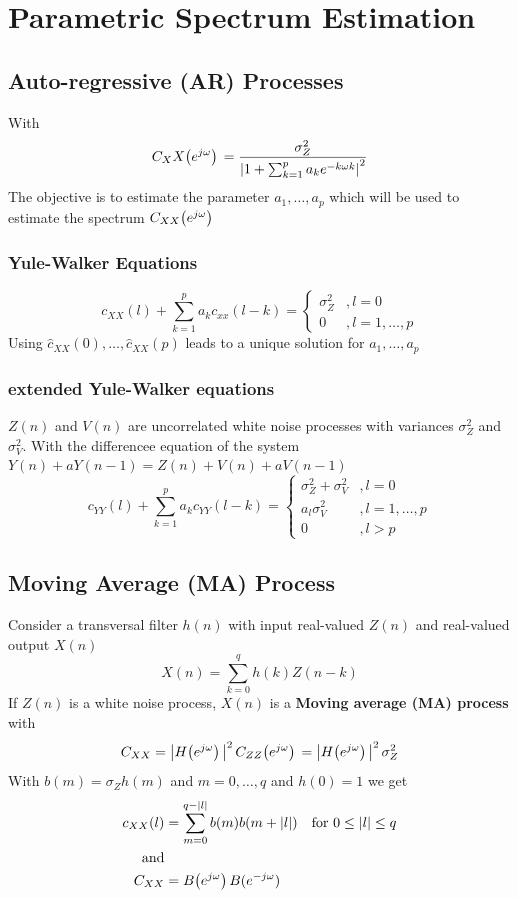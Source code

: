 \documentclass[accentcolor=tud4c,9.5pt,nochapname,bigchapter,paper=a5report]{tudreport}
\begin{document}
\chapter{Parametric Spectrum Estimation}
\section{Auto-regressive (AR) Processes}
With 
\begin{equation}
C_XX{\left(e^{j\omega}\right)}\, = \frac{\sigma_Z^2}{\left|1+\sum_{k=1}^p a_k e^{-k\omega k} \right|^2}
\end{equation}
The objective is to estimate the parameter $a_1,\ldots,a_p$ which will be used to estimate the spectrum $C_{XX}{\left(e^{j\omega}\right)}\,$
\subsection{Yule-Walker Equations}
\begin{equation}
c_{XX}(l)+ \sum\limits_{k=1}^p a_kc_{xx}(l-k)=\begin{cases}
\sigma_Z^2 &,l=0\\
0 &,l=1,\ldots,p
\end{cases}
\end{equation}
Using $\hat{c}_{XX}(0),\ldots,\hat{c}_{XX}(p)$ leads to a unique solution for $a_1,\ldots,a_p$

\subsection{extended Yule-Walker equations}
$Z(n)$ and $V(n)$ are uncorrelated white noise processes with variances $\sigma^2_Z$ and $\sigma_V^2$. With the
differencee equation of the system $Y(n)+aY(n-1)=Z(n)+V(n)+aV(n-1)$
\begin{equation}
c_{YY}(l)+\sum\limits_{k=1}^p a_kc_{YY}(l-k) =\begin{cases}
\sigma_Z^2+\sigma_V^2 &,l=0 \\
a_l\sigma_V^2 &,l=1,\ldots,p\\
0 &,l>p 
\end{cases}
\end{equation}

\section{Moving Average (MA) Process}
Consider a transversal filter $h(n)$ with input real-valued $Z(n)$ and real-valued output $X(n)$
\begin{equation}
X(n)=\sum\limits_{k=0}^q h(k)Z(n-k)
\end{equation} 
If $Z(n)$ is a white noise process, $X(n)$ is a {\bf Moving average (MA) process} with
\begin{equation}
C_{XX}=\left|H{\left(e^{j\omega}\right)}\,\right|^2C_{ZZ}{\left(e^{j\omega}\right)}\, =\left|H{\left(e^{j\omega}\right)}\,\right|^2\sigma_Z^2 
\end{equation}
With $b(m)=\sigma_Z h(m)$ and $m=0,\ldots,q$ and $h(0)=1$ we get
\begin{align}
c_{XX}(l)&=\sum\limits_{m=0}^{q-|l|} b(m)b(m+|l|) \quad \text{for } 0\leq |l| \leq q\\
\text{and}\\
C_{XX} &= B{\left(e^{j\omega}\right)}\, B(e^{-j\omega})
\end{align}
\end{document}
